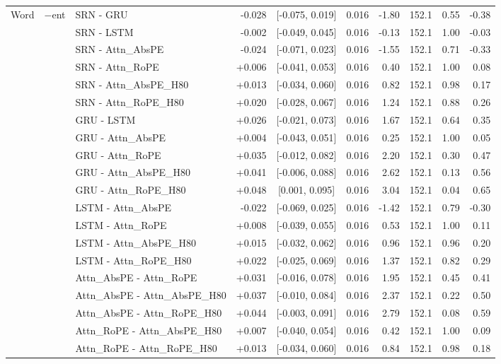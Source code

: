 \begin{longtable}{@{}lllrcrrrrr@{}}
\bottomrule
\endlastfoot
Word & $-$ent & SRN - GRU & -0.028 & [-0.075, 0.019] & 0.016 & -1.80 & 152.1 & 0.55 & -0.38 \\
 &  & SRN - LSTM & -0.002 & [-0.049, 0.045] & 0.016 & -0.13 & 152.1 & 1.00 & -0.03 \\
 &  & SRN - Attn\_AbsPE & -0.024 & [-0.071, 0.023] & 0.016 & -1.55 & 152.1 & 0.71 & -0.33 \\
 &  & SRN - Attn\_RoPE & +0.006 & [-0.041, 0.053] & 0.016 & 0.40 & 152.1 & 1.00 & 0.08 \\
 &  & SRN - Attn\_AbsPE\_H80 & +0.013 & [-0.034, 0.060] & 0.016 & 0.82 & 152.1 & 0.98 & 0.17 \\
 &  & SRN - Attn\_RoPE\_H80 & +0.020 & [-0.028, 0.067] & 0.016 & 1.24 & 152.1 & 0.88 & 0.26 \\
 &  & GRU - LSTM & +0.026 & [-0.021, 0.073] & 0.016 & 1.67 & 152.1 & 0.64 & 0.35 \\
 &  & GRU - Attn\_AbsPE & +0.004 & [-0.043, 0.051] & 0.016 & 0.25 & 152.1 & 1.00 & 0.05 \\
 &  & GRU - Attn\_RoPE & +0.035 & [-0.012, 0.082] & 0.016 & 2.20 & 152.1 & 0.30 & 0.47 \\
 &  & GRU - Attn\_AbsPE\_H80 & +0.041 & [-0.006, 0.088] & 0.016 & 2.62 & 152.1 & 0.13 & 0.56 \\
 &  & GRU - Attn\_RoPE\_H80 & +0.048 & [0.001, 0.095] & 0.016 & 3.04 & 152.1 & 0.04 & 0.65 \\
 &  & LSTM - Attn\_AbsPE & -0.022 & [-0.069, 0.025] & 0.016 & -1.42 & 152.1 & 0.79 & -0.30 \\
 &  & LSTM - Attn\_RoPE & +0.008 & [-0.039, 0.055] & 0.016 & 0.53 & 152.1 & 1.00 & 0.11 \\
 &  & LSTM - Attn\_AbsPE\_H80 & +0.015 & [-0.032, 0.062] & 0.016 & 0.96 & 152.1 & 0.96 & 0.20 \\
 &  & LSTM - Attn\_RoPE\_H80 & +0.022 & [-0.025, 0.069] & 0.016 & 1.37 & 152.1 & 0.82 & 0.29 \\
 &  & Attn\_AbsPE - Attn\_RoPE & +0.031 & [-0.016, 0.078] & 0.016 & 1.95 & 152.1 & 0.45 & 0.41 \\
 &  & Attn\_AbsPE - Attn\_AbsPE\_H80 & +0.037 & [-0.010, 0.084] & 0.016 & 2.37 & 152.1 & 0.22 & 0.50 \\
 &  & Attn\_AbsPE - Attn\_RoPE\_H80 & +0.044 & [-0.003, 0.091] & 0.016 & 2.79 & 152.1 & 0.08 & 0.59 \\
 &  & Attn\_RoPE - Attn\_AbsPE\_H80 & +0.007 & [-0.040, 0.054] & 0.016 & 0.42 & 152.1 & 1.00 & 0.09 \\
 &  & Attn\_RoPE - Attn\_RoPE\_H80 & +0.013 & [-0.034, 0.060] & 0.016 & 0.84 & 152.1 & 0.98 & 0.18 \\

\end{longtable}
